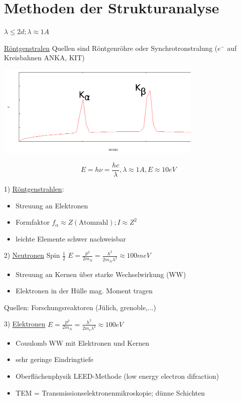 \section{Methoden der Strukturanalyse}

\(\lambda \leq 2d; \lambda \approx 1A\)

\underline{Röntgenstralen} Quellen sind Röntgenröhre oder
Synchrotronstralung (\(e^-\) auf Kreisbahnen ANKA, KIT)



\includegraphics[width=0.75\textwidth]{kap03_05.png}



\[ E = h\nu = \frac {hc}{\lambda}, \lambda \approx 1 A, E\approx
10eV\]

1) \underline{Röntgenstrahlen}:

\begin{itemize}
\item Streuung an Elektronen
\item Formfaktor \(f_\alpha \approx Z (\text{Atomzahl}); I\approx Z^2\)
\item leichte Elemente schwer nachweisbar
\end{itemize}

2) \underline{Neutronen}  Spin \(\frac 1 2\) \(E=\frac {p^2}{2m_N}=\frac
{h^2}{2m_N\lambda^2}\approx 100meV\)

\begin{itemize}
\item Streuung an Kernen über starke Wechselwirkung (WW)
\item Elektronen in der Hülle mag. Moment tragen
\end{itemize}

Quellen: Forschungsreaktoren (Jülich, grenoble,...)

3) \underline{Elektronen} \(E=\frac {p^2}{2m_N}=\frac
{h^2}{2m_e\lambda^2}\approx 100eV\)
\begin{itemize}
\item Couulomb WW mit Elektronen und Kernen
\item sehr geringe Eindringtiefe
\item Oberflächenphysik LEED-Methode (low energy electron difraction)
\item TEM = Transmissionselektronenmikroskopie; dünne Schichten
\end{itemize}


